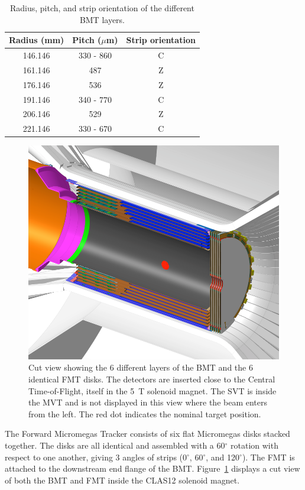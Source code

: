 \begin{table}
    \centering
    \begin{tabular}{|c|c|c|}
    \hline
    Radius (mm) & Pitch ($\mu$m) & Strip orientation \\
    \hline
    146.146 & 330 - 860 & C \\
    161.146 & 487 & Z \\
    176.146 & 536 & Z \\
    191.146 & 340 - 770 & C \\
    206.146 & 529 & Z \\
    221.146 & 330 - 670 & C \\
    \hline
    \end{tabular}
    \caption{Radius, pitch, and strip orientation of the different BMT layers.}
\end{table}

\begin{figure}[htb]
 \includegraphics[width=1.0\columnwidth,keepaspectratio]{images/fig1}
 \caption{Cut view showing the 6 different layers of the BMT and the 6 identical FMT disks. The detectors are inserted
   close to the Central Time-of-Flight, itself in the 5~T solenoid magnet. The SVT is inside the MVT and is not displayed in
   this view where the beam enters from the left. The red dot indicates the nominal target position.}
 \label{fig:mm-fig1}
\end{figure}

The Forward Micromegas Tracker consists of six flat Micromegas disks stacked together. The disks are all identical and
assembled with a 60$^\circ$ rotation with respect to one another, giving 3 angles of strips (0$^\circ$, 60$^\circ$, and
120$^\circ$). The FMT is attached to the downstream end flange of the BMT. Figure~\ref{fig:mm-fig1} displays a cut view
of both the BMT and FMT inside the CLAS12 solenoid magnet.

